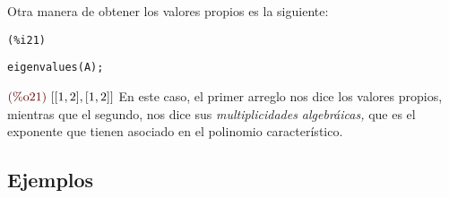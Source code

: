 \begin{solucion}

Otra manera de obtener los valores propios es la siguiente:

\noindent
%
\begin{minipage}{8ex}{\color{red}\bf
\begin{verbatim}
(%i21)
\end{verbatim}}
\end{minipage}
\begin{minipage}{\textwidth}{\color{blue}
\begin{verbatim}
eigenvalues(A);
\end{verbatim}}
\end{minipage}
\begin{math}\displaystyle
\parbox{8ex}{\color{labelcolor}(\%o21) }
[[1,2],[1,2]]
\end{math}
%
En este caso, el primer arreglo nos dice los valores propios, mientras que el segundo, nos dice sus
\emph{multiplicidades algebráicas,} que es el exponente que tienen asociado en el polinomio característico.
\end{solucion}

\subsection*{Ejemplos}


